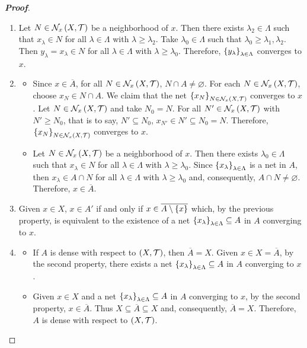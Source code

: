 \begin{proposition}
  \begin{proof}[\rm\textbf{Proof}]
    \hfill
    \begin{enumerate}
      \item Let $N\in\mathcal{N}_x\left(X,\mathcal{T}\right)$ be a neighborhood of $x$. Then there exists $\lambda_2\in\Lambda$ such that $x_\lambda\in N$ for all $\lambda\in\Lambda$ with $\lambda\geq\lambda_2$. Take $\lambda_0\in\Lambda$ such that $\lambda_0\geq\lambda_1,\lambda_2$. Then $y_\lambda=x_\lambda\in N$ for all $\lambda\in\Lambda$ with $\lambda\geq\lambda_0$. Therefore, $\left\{y_\lambda\right\}_{\lambda\in\Lambda}$ converges to $x$.
      \item \begin{itemize}
        \item[\boxed{\Rightarrow}] Since $x\in\overline{A}$, for all $N\in\mathcal{N}_x\left(X,\mathcal{T}\right)$, $N\cap A\neq\varnothing$. For each $N\in\mathcal{N}_x\left(X,\mathcal{T}\right)$, choose $x_N\in N\cap A$. We claim that the net $\left\{x_N\right\}_{N\in\mathcal{N}_x\left(X,\mathcal{T}\right)}$ converges to $x$. Let $N\in\mathcal{N}_x\left(X,\mathcal{T}\right)$ and take $N_0=N$. For all $N'\in\mathcal{N}_x\left(X,\mathcal{T}\right)$ with $N'\geq N_0$, that is to say, $N'\subseteq N_0$, $x_{N'}\in N'\subseteq N_0=N$. Therefore, $\left\{x_N\right\}_{N\in\mathcal{N}_x\left(X,\mathcal{T}\right)}$ converges to $x$.
        \item[\boxed{\Leftarrow}] Let $N\in\mathcal{N}_x\left(X,\mathcal{T}\right)$ be a neighborhood of $x$. Then there exists $\lambda_0\in\Lambda$ such that $x_\lambda\in N$ for all $\lambda\in\Lambda$ with $\lambda\geq\lambda_0$. Since $\left\{x_\lambda\right\}_{\lambda\in\Lambda}$ is a net in $A$, then $x_\lambda\in A\cap N$ for all $\lambda\in\Lambda$ with $\lambda\geq\lambda_0$ and, consequently, $A\cap N\neq\varnothing$. Therefore, $x\in\overline{A}$.
      \end{itemize}
      \item Given $x\in X$, $x\in A'$ if and only if $x\in\overline{A\setminus\left\{x\right\}}$ which, by the previous property, is equivalent to the existence of a net $\left\{x_\lambda\right\}_{\lambda\in\Lambda}\subseteq A$ in $A$ converging to $x$.
      \item \begin{itemize}
        \item[\boxed{\Rightarrow}] If $A$ is dense with respect to $\left(X,\mathcal{T}\right)$, then $\overline{A}=X$. Given $x\in X=\overline{A}$, by the second property, there exists a net $\left\{x_\lambda\right\}_{\lambda\in\Lambda}\subseteq A$ in $A$ converging to $x$.
        \item[\boxed{\Leftarrow}] Given $x\in X$ and a net $\left\{x_\lambda\right\}_{\lambda\in\Lambda}\subseteq A$ in $A$ converging to $x$, by the second property, $x\in\overline{A}$. Thus $X\subseteq\overline{A}\subseteq X$ and, consequently, $\overline{A}=X$. Therefore, $A$ is dense with respect to $\left(X,\mathcal{T}\right)$.

\end{itemize}
\end{enumerate}
\end{proof}
\end{proposition}
